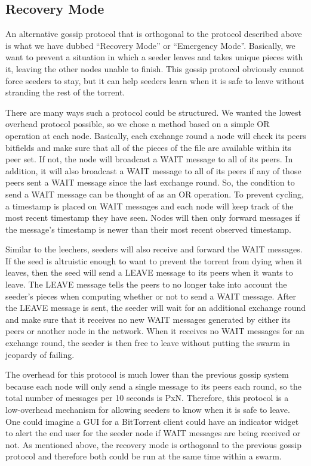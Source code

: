 \subsection{Recovery Mode}

An alternative gossip protocol that is orthogonal to the protocol described above is 
what we have dubbed ``Recovery Mode'' or ``Emergency Mode''. Basically, we
want to prevent a situation in which a seeder leaves and takes unique pieces
with it, leaving the other nodes unable to finish. This gossip protocol obviously
cannot force seeders to stay, but it can help seeders learn when it is safe to
leave without stranding the rest of the torrent. 

There are many ways such a protocol could be structured. We wanted the lowest
overhead protocol possible, so we chose a method based on a simple OR operation
at each node. Basically, each exchange round a node will check its peers bitfields
and make sure that all of the pieces of the file are available within its peer
set. If not, the node will broadcast a WAIT message to all of its peers. In addition, it will
also broadcast a WAIT message to all of its peers if any of those peers sent a 
WAIT message since the last exchange round. So, the condition to send a WAIT message 
can be thought of as an OR operation. To prevent cycling, a timestamp is placed
on WAIT messages and each node will keep track of the most recent timestamp they have seen. 
Nodes will then only forward messages if the message's timestamp is newer than their most 
recent observed timestamp.

Similar to the leechers, seeders will also receive and forward the WAIT messages. If the 
seed is altruistic enough to want to prevent the torrent from dying when it leaves,
then the seed will send a LEAVE message to its peers when it wants to leave. The LEAVE
message tells the peers to no longer take into account the seeder's pieces when computing
whether or not to send a WAIT message. After the LEAVE message is sent, the seeder will
wait for an additional exchange round and make sure that it receives no new WAIT messages
generated by either its peers or another node in the network. When it receives no WAIT
messages for an exchange round, the seeder is then free to leave without putting the 
swarm in jeopardy of failing. 

The overhead for this protocol is much lower than the previous gossip
system because each node will only send a single message to its peers
each round, so the total number of messages per 10 seconds is PxN. Therefore,
this protocol is a low-overhead mechanism for allowing seeders to know when it is safe
to leave. One could imagine a GUI for a BitTorrent client could have an indicator widget
to alert the end user for the seeder node if WAIT messages are being received or not. As
mentioned above, the recovery mode is orthogonal to the previous gossip
protocol and therefore both could be run at the same time within a swarm.

